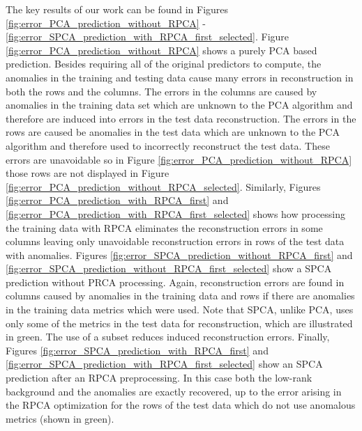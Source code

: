 \documentclass[conference]{IEEEtran}
\begin{document}
The key results of our work can be found in Figures \ref{fig:error_PCA_prediction_without_RPCA} -  
\ref{fig:error_SPCA_prediction_with_RPCA_first_selected}.
Figure \ref{fig:error_PCA_prediction_without_RPCA} shows a purely PCA based prediction.  Besides requiring all of the original predictors to compute, the anomalies in the training and testing data cause many errors in reconstruction in both the rows and the columns.  The errors in the columns are caused by anomalies in the training data set which are unknown to the PCA algorithm and therefore are induced into errors in the test data reconstruction.  The errors in the rows are caused be anomalies in the test data which are unknown to the PCA algorithm and therefore used to incorrectly reconstruct the test data.  These errors are unavoidable so in Figure \ref {fig:error_PCA_prediction_without_RPCA} those rows are not displayed in Figure \ref {fig:error_PCA_prediction_without_RPCA_selected}.
Similarly, Figures \ref{fig:error_PCA_prediction_with_RPCA_first}  and  \ref {fig:error_PCA_prediction_with_RPCA_first_selected} shows how processing the training data with RPCA eliminates the reconstruction errors in some columns leaving only unavoidable reconstruction errors in rows of the test data with anomalies.   
Figures \ref{fig:error_SPCA_prediction_without_RPCA_first} and \ref{fig:error_SPCA_prediction_without_RPCA_first_selected} show a SPCA prediction without PRCA processing.  Again, reconstruction errors are found in columns caused by anomalies in the training data and rows if there are anomalies in the training data metrics which were used.  Note that SPCA, unlike PCA, uses only some of the metrics in the test data for reconstruction, which are illustrated in green. The use of a subset reduces induced reconstruction errors.
Finally, Figures \ref{fig:error_SPCA_prediction_with_RPCA_first} and \ref{fig:error_SPCA_prediction_with_RPCA_first_selected} show an SPCA prediction after an RPCA preprocessing.  In this case both the low-rank background and the anomalies are exactly recovered, up to the error arising in the RPCA optimization for the rows of the test data which do not use anomalous metrics (shown in green).
\end{document}
